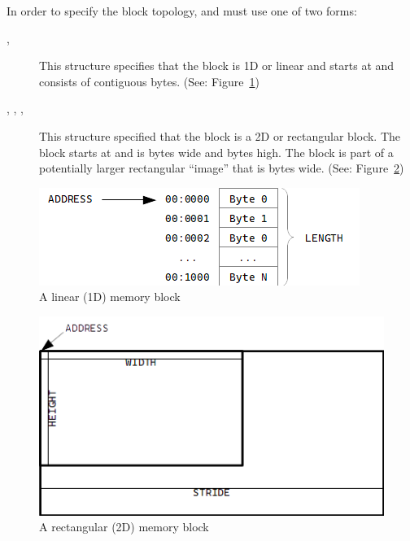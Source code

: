 \documentclass{report}
\begin{document}
    In order to specify the block topology,  and  must
    use one of two forms:

    \begin{description}
        \item[ , ]
            This structure specifies that the block is 1D or linear and starts at 
            and consists of  contiguous bytes. (See: Figure~\ref{memcopy_1d})
        
        \item[ , , , ]
            This structure specified that the block is a 2D or rectangular block.
            The block starts at  and is  bytes wide and
             bytes high.
            The block is part of a potentially larger rectangular ``image'' that is
             bytes wide. (See: Figure~\ref{memcopy_2d})
    \end{description}

    \begin{figure}[htbp]
        \centering
        \includegraphics{MEMCOPY_LINEAR.png}
        \caption{A linear (1D) memory block}
        \label{memcopy_1d}
    \end{figure}

    \begin{figure}[htbp]
        \centering
        \includegraphics{MEMCOPY_RECT.png}
        \caption{A rectangular (2D) memory block}
        \label{memcopy_2d}
    \end{figure}
\end{document}
